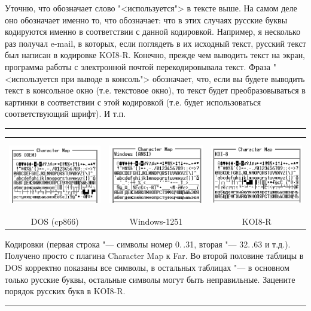 Уточню, что обозначает слово "<используется"> в тексте выше. На самом деле оно обозначает именно то,
что обозначает: что в этих случаях русские буквы кодируются именно в соответствии с данной
кодировкой. Например, я несколько раз получал e-mail, в которых, если поглядеть в их исходный текст,
русский текст был написан в кодировке KOI8-R. Конечно, прежде чем выводить текст на экран,
программа работы с электронной почтой перекодировывала текст. Фраза "<используется при выводе в
консоль"> обозначает, что, если вы будете выводить текст в консольное окно (т.е. текстовое окно), то
текст будет преобразовываться в картинки в соответствии с этой кодировкой (т.е. будет 
использоваться соответствующий шрифт). И т.п.

\begin{center}
\hrule

\vspace{0.2cm}
{\footnotesize 
      
\begin{tabular}{ccc}
\includegraphics[width=5cm,height=3.128cm]{ideas/03_1_encodings/dos.bmp}&
\includegraphics[width=5cm,height=3.128cm]{ideas/03_1_encodings/win.bmp}&
\includegraphics[width=5cm,height=3.128cm]{ideas/03_1_encodings/koi.bmp}\\
DOS (cp866)&Windows-1251&KOI8-R
\end{tabular}

Кодировки (первая строка "--- символы номер 0.\,.31, вторая "--- 32.\,.63 и т.д.). Получено просто 
с плагина Character Map к Far. Во второй половине таблицы в DOS корректно показаны все символы, в 
остальных таблицах "--- в основном только русские буквы, остальные символы могут быть неправильные. 
Зацените порядок русских букв в KOI8-R.

}

\vspace{0.2cm}

\hrule
\end{center}

